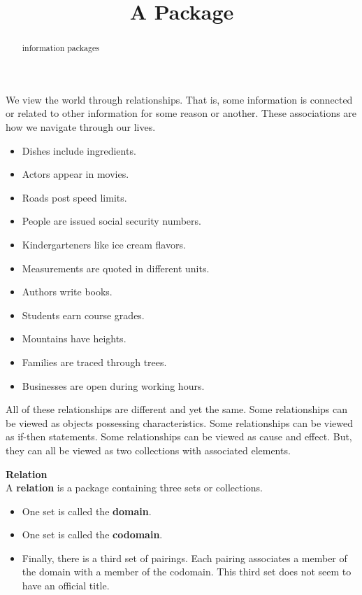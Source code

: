 \documentclass{ximera}
\title{A Package}
\begin{document}
\begin{abstract}
information packages
\end{abstract}
\maketitle


We view the world through relationships. That is, some information is connected or related to other information for some reason or another. These associations are how we navigate through our lives.

\begin{itemize}
\item Dishes include ingredients.
\item Actors appear in movies.
\item Roads post speed limits.
\item People are issued social security numbers.
\item Kindergarteners like ice cream flavors.
\item Measurements are quoted in different units.
\item Authors write books.
\item Students earn course grades.
\item Mountains have heights.
\item Families are traced through trees.
\item Businesses are open during working hours.
\end{itemize}


All of these relationships are different and yet the same.  Some relationships can be viewed as objects possessing characteristics. Some relationships can be viewed as if-then statements.  Some relationships can be viewed as cause and effect. But, they can all be viewed as two collections with associated elements.







\begin{definition} \textbf{\textcolor{green!50!black}{Relation}} \\
A \textbf{relation} is a package containing three sets or collections. 


\begin{itemize}
\item One set is called the \textbf{\textcolor{purple!85!blue}{domain}}. 
\item One set is called the \textbf{\textcolor{purple!85!blue}{codomain}}.  
\item Finally, there is a third set of pairings.  Each pairing associates a member of the domain with a member of the codomain. This third set does not seem to have an official title.
\end{itemize}

\end{definition}
\end{document}
